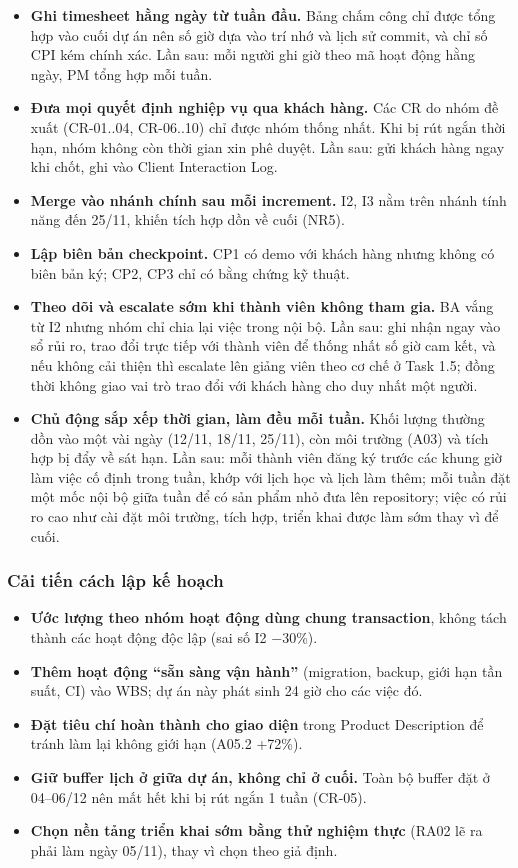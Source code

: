 \begin{itemize}
    \item \textbf{Ghi timesheet hằng ngày từ tuần đầu.} Bảng chấm công chỉ được tổng hợp vào cuối dự án nên số giờ dựa vào trí nhớ và lịch sử commit, và chỉ số CPI kém chính xác. Lần sau: mỗi người ghi giờ theo mã hoạt động hằng ngày, PM tổng hợp mỗi tuần.
    \item \textbf{Đưa mọi quyết định nghiệp vụ qua khách hàng.} Các CR do nhóm đề xuất (CR-01..04, CR-06..10) chỉ được nhóm thống nhất. Khi bị rút ngắn thời hạn, nhóm không còn thời gian xin phê duyệt. Lần sau: gửi khách hàng ngay khi chốt, ghi vào Client Interaction Log.
    \item \textbf{Merge vào nhánh chính sau mỗi increment.} I2, I3 nằm trên nhánh tính năng đến 25/11, khiến tích hợp dồn về cuối (NR5).
    \item \textbf{Lập biên bản checkpoint.} CP1 có demo với khách hàng nhưng không có biên bản ký; CP2, CP3 chỉ có bằng chứng kỹ thuật.
    \item \textbf{Theo dõi và escalate sớm khi thành viên không tham gia.} BA vắng từ I2 nhưng nhóm chỉ chia lại việc trong nội bộ. Lần sau: ghi nhận ngay vào sổ rủi ro, trao đổi trực tiếp với thành viên để thống nhất số giờ cam kết, và nếu không cải thiện thì escalate lên giảng viên theo cơ chế ở Task 1.5; đồng thời không giao vai trò trao đổi với khách hàng cho duy nhất một người.
    \item \textbf{Chủ động sắp xếp thời gian, làm đều mỗi tuần.} Khối lượng thường dồn vào một vài ngày (12/11, 18/11, 25/11), còn môi trường (A03) và tích hợp bị đẩy về sát hạn. Lần sau: mỗi thành viên đăng ký trước các khung giờ làm việc cố định trong tuần, khớp với lịch học và lịch làm thêm; mỗi tuần đặt một mốc nội bộ giữa tuần để có sản phẩm nhỏ đưa lên repository; việc có rủi ro cao như cài đặt môi trường, tích hợp, triển khai được làm sớm thay vì để cuối.
\end{itemize}

\subsubsection{Cải tiến cách lập kế hoạch}

\begin{itemize}
    \item \textbf{Ước lượng theo nhóm hoạt động dùng chung transaction}, không tách thành các hoạt động độc lập (sai số I2 $-$30\%).
    \item \textbf{Thêm hoạt động ``sẵn sàng vận hành''} (migration, backup, giới hạn tần suất, CI) vào WBS; dự án này phát sinh 24 giờ cho các việc đó.
    \item \textbf{Đặt tiêu chí hoàn thành cho giao diện} trong Product Description để tránh làm lại không giới hạn (A05.2 +72\%).
    \item \textbf{Giữ buffer lịch ở giữa dự án, không chỉ ở cuối.} Toàn bộ buffer đặt ở 04--06/12 nên mất hết khi bị rút ngắn 1 tuần (CR-05).
    \item \textbf{Chọn nền tảng triển khai sớm bằng thử nghiệm thực} (RA02 lẽ ra phải làm ngày 05/11), thay vì chọn theo giả định.
\end{itemize}
